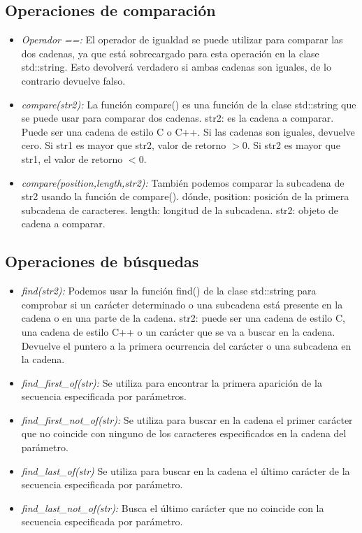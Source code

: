 \subsection{Operaciones de comparación}
\begin{itemize}
	\item \emph{Operador ==:} El operador de igualdad se puede utilizar para comparar las dos cadenas, ya que está sobrecargado para esta operación en la clase std::string. Esto devolverá verdadero si ambas cadenas son iguales, de lo contrario devuelve falso.
	\item \emph{compare(str2):} La función compare() es una función de la clase std::string que se puede usar para comparar dos cadenas. str2: es la cadena a comparar. Puede ser una cadena de estilo C o C++. Si las cadenas son iguales, devuelve cero. Si str1 es mayor que str2, valor de retorno $> 0$. Si str2 es mayor que str1, el valor de retorno $< 0$.
	\item \emph{compare(position,length,str2):} También podemos comparar la subcadena de str2 usando la función de compare(). dónde, position: posición de la primera subcadena de caracteres. length: longitud de la subcadena. str2: objeto de cadena a comparar.
\end{itemize}
\subsection{Operaciones de búsquedas}
\begin{itemize}
	\item \emph{find(str2):} Podemos usar la función find() de la clase std::string para comprobar si un carácter determinado o una subcadena está presente en la cadena o en una parte de la cadena. str2: puede ser una cadena de estilo C, una cadena de estilo C++ o un carácter que se va a buscar en la cadena. Devuelve el puntero a la primera ocurrencia del carácter o una subcadena en la cadena.
	\item \emph{find\_first\_of(str):} Se utiliza para encontrar la primera aparición de la secuencia especificada por parámetros.
	\item \emph{find\_first\_not\_of(str):} Se utiliza para buscar en la cadena el primer carácter que no coincide con ninguno de los caracteres especificados en la cadena del parámetro.
	\item \emph{find\_last\_of(str)} Se utiliza para buscar en la cadena el último carácter de la secuencia especificada por parámetro.
	\item \emph{find\_last\_not\_of(str):} Busca el último carácter que no coincide con la secuencia especificada por parámetro.
\end{itemize}
